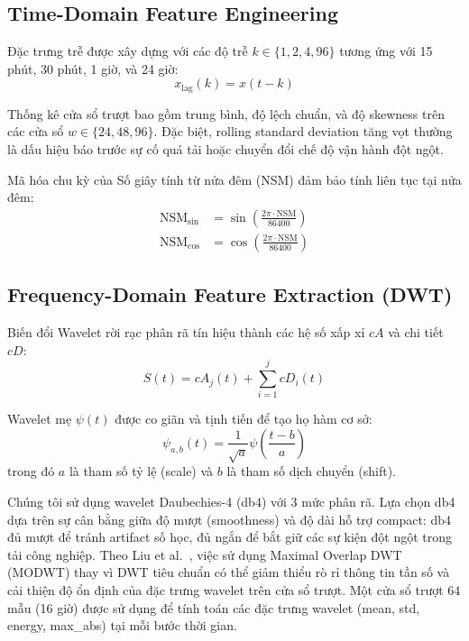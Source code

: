 \documentclass[conference]{IEEEtran}
\begin{document}
\subsection{Time-Domain Feature Engineering}

Đặc trưng trễ được xây dựng với các độ trễ $k \in \{1, 2, 4, 96\}$
tương ứng với 15 phút, 30 phút, 1 giờ, và 24 giờ:
\begin{equation}
x_{\text{lag}}(k) = x(t - k)
\label{eq:lag}
\end{equation}

Thống kê cửa sổ trượt bao gồm trung bình, độ lệch chuẩn,
và độ skewness trên các cửa sổ $w \in \{24, 48, 96\}$.
Đặc biệt, rolling standard deviation tăng vọt thường là dấu hiệu báo trước sự cố quá tải hoặc chuyển đổi chế độ vận hành đột ngột.

Mã hóa chu kỳ của Số giây tính từ nửa đêm (NSM)
đảm bảo tính liên tục tại nửa đêm:
\begin{align}
\text{NSM}_{\sin} &= \sin\left(\frac{2\pi \cdot \text{NSM}}{86400}\right) \\
\text{NSM}_{\cos} &= \cos\left(\frac{2\pi \cdot \text{NSM}}{86400}\right)
\end{align}

\subsection{Frequency-Domain Feature Extraction (DWT)}

Biến đổi Wavelet rời rạc phân rã tín hiệu thành
các hệ số xấp xỉ $cA$ và chi tiết $cD$:
\begin{equation}
S(t) = cA_j(t) + \sum_{i=1}^{j} cD_i(t)
\label{eq:dwt}
\end{equation}

Wavelet mẹ $\psi(t)$ được co giãn và tịnh tiến để tạo họ hàm cơ sở:
\begin{equation}
\psi_{a,b}(t) = \frac{1}{\sqrt{a}}\psi\left(\frac{t-b}{a}\right)
\label{eq:wavelet_basis}
\end{equation}
trong đó $a$ là tham số tỷ lệ (scale) và $b$ là tham số dịch chuyển (shift).

Chúng tôi sử dụng wavelet Daubechies-4 (db4) với 3 mức phân rã.
Lựa chọn db4 dựa trên sự cân bằng giữa độ mượt (smoothness) và độ dài hỗ trợ compact:
db4 đủ mượt để tránh artifact số học, đủ ngắn để bắt giữ các sự kiện đột ngột trong tải công nghiệp.
Theo Liu et al.~\cite{liu2022modwt}, việc sử dụng Maximal Overlap DWT (MODWT)
thay vì DWT tiêu chuẩn có thể giảm thiểu rò rỉ thông tin tần số
và cải thiện độ ổn định của đặc trưng wavelet trên cửa sổ trượt.
Một cửa sổ trượt 64 mẫu (16 giờ) được sử dụng để tính toán
các đặc trưng wavelet (mean, std, energy, max\_abs) tại mỗi bước thời gian.
\end{document}
